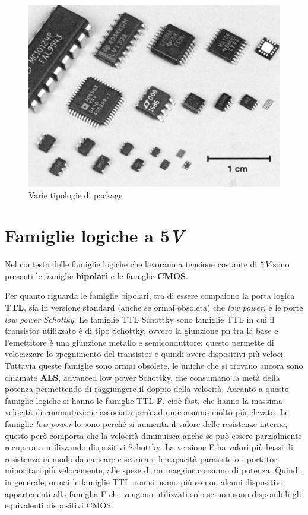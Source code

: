 \documentclass[12pt, a4paper]{report}
\begin{document}
\begin{description}
\begin{figure}[hb]
        \includegraphics[scale=0.28,angle=0]{package.png}
        \caption{Varie tipologie di package}
    \end{figure}
\end{description}

\section{Famiglie logiche a 5\textit{V}}
Nel contesto delle famiglie logiche che lavorano a tensione costante di $5\,V$ sono presenti le famiglie \textbf{bipolari} e le famiglie \textbf{CMOS}.

Per quanto riguarda le famiglie bipolari, tra di essere compaiono la porta logica \textbf{TTL}, sia in versione standard (anche se ormai obsoleta) che \textit{low power}, e le porte \textit{low power Schottky}. Le famiglie TTL Schottky sono famiglie TTL in cui il transistor utilizzato è di tipo Schottky, ovvero la giunzione pn tra la base e l'emettitore è una giunzione metallo e semiconduttore; questo permette di velocizzare lo spegnimento del transistor e quindi avere dispositivi più veloci. Tuttavia queste famiglie sono ormai obsolete, le uniche che si trovano ancora sono chiamate \textbf{ALS}, advanced low power Schottky, che consumano la metà della potenza permettendo di raggiungere il doppio della velocità. Accanto a queste famiglie logiche si hanno le famiglie TTL \textbf{F}, cioè fast, che hanno la massima velocità di commutazione associata però ad un consumo molto più elevato. Le famiglie \textit{low power} lo sono perché si aumenta il valore delle resistenze interne, questo però comporta che la velocità diminuisca anche se può essere parzialmente recuperata utilizzando dispositivi Schottky. La versione F ha valori più bassi di resistenza in modo da caricare e scaricare le capacità parassite o i portatori minoritari più velocemente, alle spese di un maggior consumo di potenza. Quindi, in generale, ormai le famiglie TTL non si usano più se non alcuni dispositivi appartenenti alla famiglia F che vengono utilizzati solo se non sono disponibili gli equivalenti dispositivi CMOS.
\end{document}
